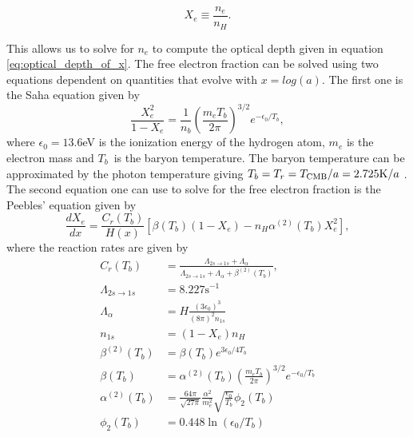 \documentclass[onecolumn]{aastex62}
\begin{document}
\begin{equation}\label{eq:Xe}
    X_e\equiv\frac{n_e}{n_H}.
\end{equation}
 
This allows us to solve for $n_e$ to compute the optical depth given in equation \ref{eq:optical_depth_of_x}. The free electron fraction can be solved using two equations dependent on quantities that evolve with $x=log(a)$. The first one is the Saha equation given by
\begin{equation}\label{eq:saha_eq}
    \frac{X_e^2}{1-X_e} = \frac{1}{n_b} \left(\frac{m_eT_b}{2\pi}\right)^{3/2} e^{-\epsilon_0/T_b},
\end{equation}
where $\epsilon_0=13.6$eV is the ionization energy of the hydrogen atom, $m_e$ is the electron mass and $T_b$ is the baryon temperature. The baryon temperature can be approximated by the photon temperature giving $T_b =
T_r = T_{\rm CMB} / a = 2.725 \textrm{K} / a$ \cite{WintherII:2020}. The second equation one can use to solve for the free electron fraction is the Peebles' equation given by
\begin{equation}\label{eq:peeble_eq}
    \frac{dX_e}{dx} = \frac{C_r(T_b)}{H(x)} \left[\beta(T_b)(1-X_e) - n_H\alpha^{(2)}(T_b)X_e^2\right],
\end{equation}
where the reaction rates are given by
\begin{align}
    C_r(T_b) &= \frac{\Lambda_{2s\rightarrow1s} +
    \Lambda_{\alpha}}{\Lambda_{2s\rightarrow1s} + \Lambda_{\alpha} +
    \beta^{(2)}(T_b)}, \\
    \Lambda_{2s\rightarrow1s} &= 8.227 \textrm{s}^{-1}\\
    \Lambda_{\alpha} &= H\frac{(3\epsilon_0)^3}{(8\pi)^2 n_{1s}}\\
    n_{1s} &= (1-X_e)n_H \\
    \beta^{(2)}(T_b) &= \beta(T_b) e^{3\epsilon_0/4T_b} \\
    \beta(T_b) &= \alpha^{(2)}(T_b) \left(\frac{m_e
    T_b}{2\pi}\right)^{3/2} e^{-\epsilon_0/T_b} \\
    \alpha^{(2)}(T_b) &= \frac{64\pi}{\sqrt{27\pi}}
    \frac{\alpha^2}{m_e^2}\sqrt{\frac{\epsilon_0}{T_b}}\phi_2(T_b) \\
    \phi_2(T_b) &= 0.448\ln(\epsilon_0/T_b)
\end{align}
\end{document}
